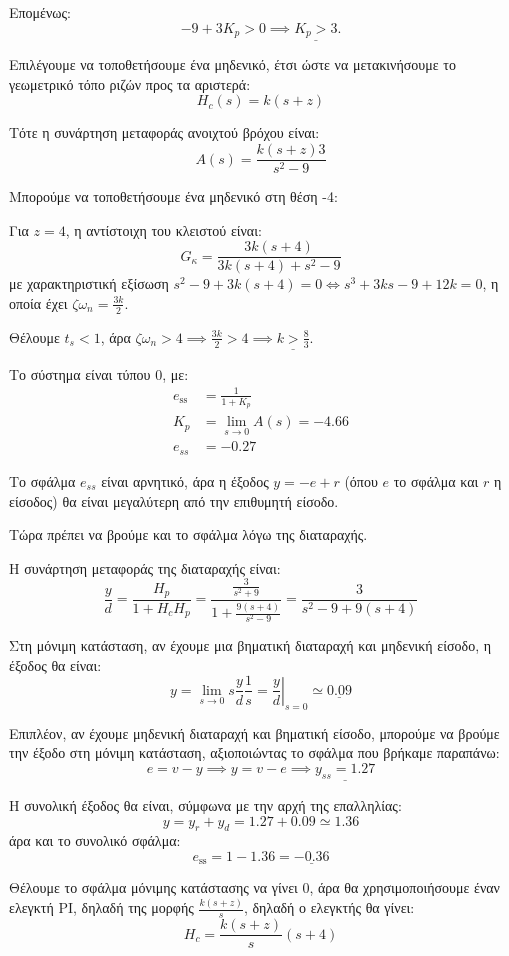 \documentclass[11pt,a4paper,notitlepage,fleqn]{article}
\begin{document}
\begin{exercise}
\begin{enumgreekparen}
	Επομένως:
	\[
	-9+3K_p > 0 \implies \underline{K_p > 3}.
	\]
	
	\item Επιλέγουμε να τοποθετήσουμε ένα μηδενικό, έτσι ώστε να μετακινήσουμε το γεωμετρικό
	τόπο ριζών προς τα αριστερά:
	\[
	H_c(s) = k(s+z)
	\]
	
	Τότε η συνάρτηση μεταφοράς ανοιχτού βρόχου είναι:
	\[
	A(s) = \frac{k(s+z)3}{s^2-9}
	\]
	
	Μπορούμε να τοποθετήσουμε ένα μηδενικό στη θέση -4:
	
	Για \( z=4 \), η αντίστοιχη του κλειστού είναι:
	\[
	G_κ = \frac{3k(s+4)}{3k(s+4)+s^2-9}
	\]
	με χαρακτηριστική εξίσωση \( s^2-9+3k(s+4) = 0 \iff s^3+3ks -9 + 12k = 0 \), η οποία
	έχει \( ζ\omega_n = \frac{3k}{2} \).
	
	Θέλουμε \( t_s < 1 \), άρα \( ζ\omega_n > 4 \implies \frac{3k}{2}>4 \implies
	\underline{k > \frac{8}{3}} \).
	
	\item
	Το σύστημα είναι τύπου 0, με:
	\begin{align*}
		e_{\mathrm{ss}} &= \frac{1}{1+K_p} \\
		K_p &= \lim_{s\to 0} A(s) = -4.66 \\
		e_{ss} &= -0.27
	\end{align*}
	
	Το σφάλμα \( e_{ss} \) είναι αρνητικό, άρα η έξοδος \( y = -e + r \) (όπου \( e \) το
	σφάλμα και \( r \) η είσοδος) θα είναι μεγαλύτερη από την επιθυμητή είσοδο.
	
	Τώρα πρέπει να βρούμε και το σφάλμα λόγω της διαταραχής.
	
	Η συνάρτηση μεταφοράς της διαταραχής είναι:
	\[
	\frac{y}{d} = \frac{H_p}{1+H_cH_p} = \frac{\frac{3}{s^2+9}}{1+\frac{9(s+4)}{s^2-9}}
	= \frac{3}{s^2-9+9(s+4)}
	\]
	
	Στη μόνιμη κατάσταση, αν έχουμε μια βηματική διαταραχή και μηδενική είσοδο, η έξοδος
	θα είναι:
	\[
	y = \lim_{s\to 0}s\frac{y}{d}\frac{1}{s} = \left.\frac{y}{d}\right|_{s=0}
	\simeq \underline{0.09}
	\]
	
	Επιπλέον, αν έχουμε μηδενική διαταραχή και βηματική είσοδο, μπορούμε να βρούμε την
	έξοδο στη μόνιμη κατάσταση, αξιοποιώντας το σφάλμα που βρήκαμε παραπάνω:
	\[
	e=v-y \implies y=v-e \implies \underline{y_{ss}= 1.27}
	\]
	
	Η συνολική έξοδος θα είναι, σύμφωνα με την αρχή της επαλληλίας:
	\[
	y=y_r + y_d = 1.27+0.09 \simeq 1.36
	\]
	άρα και το συνολικό σφάλμα:
	\[
	e_{\mathrm{ss}} = 1-1.36 = \underline{-0.36}
	\]
	\item Θέλουμε το σφάλμα μόνιμης κατάστασης να γίνει 0, άρα θα χρησιμοποιήσουμε έναν
	ελεγκτή PI, δηλαδή της μορφής \( \frac{k(s+z)}{s} \), δηλαδή ο ελεγκτής θα γίνει:
	\[
	H_c = \frac{k(s+z)}{s}(s+4)
	\]
	

\end{enumgreekparen}
\end{exercise}
\end{document}
